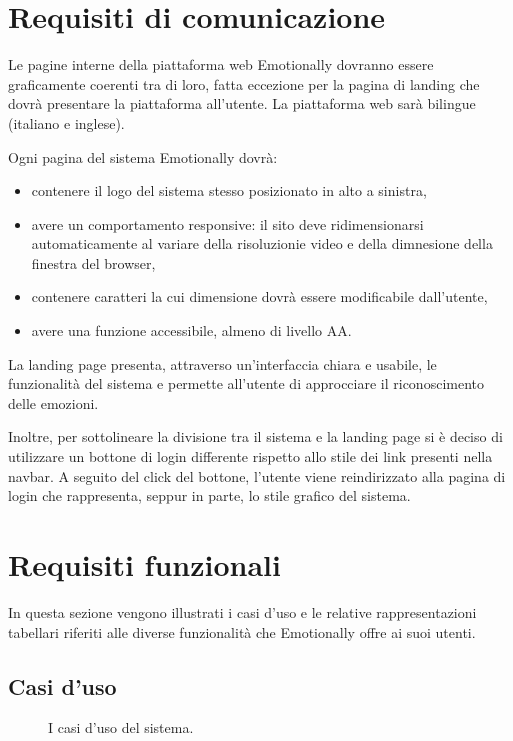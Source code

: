

\section{Requisiti di comunicazione}\label{sec:requisiti-di-comunicazione}
Le pagine interne della piattaforma web Emotionally dovranno essere 
graficamente coerenti tra di loro, fatta eccezione per la pagina di landing che 
dovrà presentare la piattaforma all'utente. La piattaforma web sarà bilingue 
(italiano e inglese).

Ogni pagina del sistema Emotionally dovrà:
\begin{itemize}
	\item contenere il logo del sistema stesso posizionato in alto a sinistra,
	\item avere un comportamento responsive: il sito deve ridimensionarsi 
	automaticamente al variare della risoluzionie video e della dimnesione 
	della finestra del browser,
	\item contenere caratteri la cui dimensione dovrà essere modificabile 
	dall'utente,
	\item avere una funzione accessibile, almeno di livello AA.
\end{itemize}
La landing page presenta, attraverso un'interfaccia chiara e usabile, le 
funzionalità del sistema e permette all'utente di approcciare il riconoscimento 
delle emozioni. 

Inoltre, per sottolineare la divisione tra il sistema e la landing page si è 
deciso di utilizzare un bottone di login differente rispetto allo stile dei 
link presenti nella navbar. A seguito del click del bottone, l'utente viene 
reindirizzato alla pagina di login che rappresenta, seppur in parte, lo stile 
grafico del sistema.

\section{Requisiti funzionali}\label{sec:requisiti-funzionali}

In questa sezione vengono illustrati i casi d'uso e le relative 
rappresentazioni tabellari riferiti alle diverse funzionalità che Emotionally 
offre ai suoi utenti. 

\subsection{Casi d'uso}

\begin{figure}[H]
	\centering
    \caption{I casi d'uso del sistema.}
    \label{fig:casi-duso}
    \resizebox{\textwidth}{!}{%
        
    }
\end{figure}

